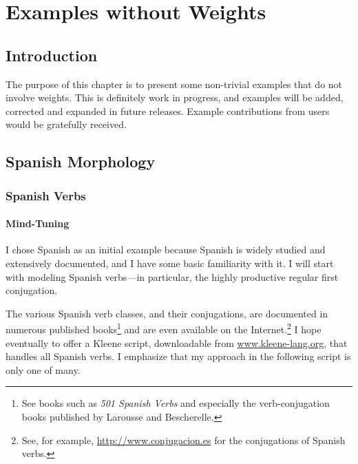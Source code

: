 \chapter{Examples without Weights}

\label{chapt:exampleswithoutweights}

\section{Introduction}

The purpose of this chapter is to present some non-trivial examples that
do not involve weights.  This is definitely work in progress, and
examples will be added, corrected and expanded in future releases.
Example contributions from users would be gratefully received.

\section{Spanish Morphology}

\subsection{Spanish Verbs}

\subsubsection{Mind-Tuning}

I chose Spanish as an initial example because Spanish is widely
studied and extensively documented, and I have some basic
familiarity with it.  I will start with modeling
Spanish verbs---in particular, the highly productive
regular first conjugation.  

The various Spanish verb classes, and
their conjugations, are documented in numerous published
books\footnote{See books such as \emph{501 Spanish Verbs} and especially the
verb-conjugation books published by Larousse and Bescherelle.} and are
even available on the Internet.\footnote{See, for example,
\url{http://www.conjugacion.es} for the conjugations of
Spanish verbs.}  I hope eventually to
offer a Kleene script, downloadable from \url{www.kleene-lang.org},
that handles all Spanish verbs.  I emphasize that my approach in the
following script is only one of many.

